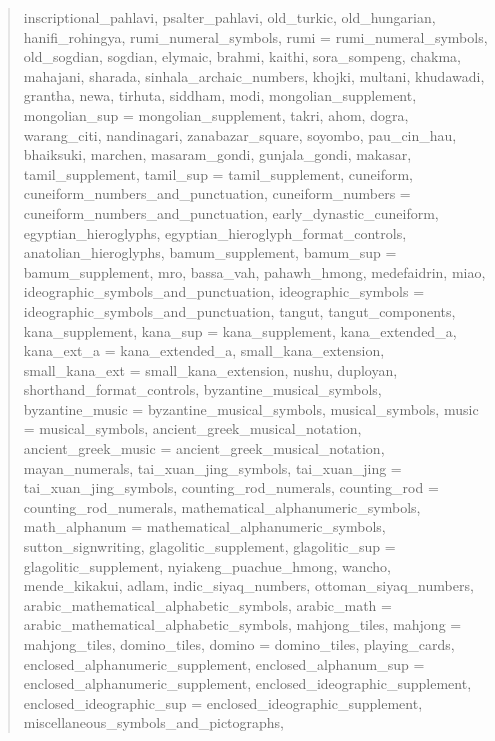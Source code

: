 \documentclass{wg21}
\begin{document}
\begin{quote}
\begin{itemdecl}
{    inscriptional_pahlavi,
    psalter_pahlavi,
    old_turkic,
    old_hungarian,
    hanifi_rohingya,
    rumi_numeral_symbols,
    rumi = rumi_numeral_symbols,
    old_sogdian,
    sogdian,
    elymaic,
    brahmi,
    kaithi,
    sora_sompeng,
    chakma,
    mahajani,
    sharada,
    sinhala_archaic_numbers,
    khojki,
    multani,
    khudawadi,
    grantha,
    newa,
    tirhuta,
    siddham,
    modi,
    mongolian_supplement,
    mongolian_sup = mongolian_supplement,
    takri,
    ahom,
    dogra,
    warang_citi,
    nandinagari,
    zanabazar_square,
    soyombo,
    pau_cin_hau,
    bhaiksuki,
    marchen,
    masaram_gondi,
    gunjala_gondi,
    makasar,
    tamil_supplement,
    tamil_sup = tamil_supplement,
    cuneiform,
    cuneiform_numbers_and_punctuation,
    cuneiform_numbers = cuneiform_numbers_and_punctuation,
    early_dynastic_cuneiform,
    egyptian_hieroglyphs,
    egyptian_hieroglyph_format_controls,
    anatolian_hieroglyphs,
    bamum_supplement,
    bamum_sup = bamum_supplement,
    mro,
    bassa_vah,
    pahawh_hmong,
    medefaidrin,
    miao,
    ideographic_symbols_and_punctuation,
    ideographic_symbols = ideographic_symbols_and_punctuation,
    tangut,
    tangut_components,
    kana_supplement,
    kana_sup = kana_supplement,
    kana_extended_a,
    kana_ext_a = kana_extended_a,
    small_kana_extension,
    small_kana_ext = small_kana_extension,
    nushu,
    duployan,
    shorthand_format_controls,
    byzantine_musical_symbols,
    byzantine_music = byzantine_musical_symbols,
    musical_symbols,
    music = musical_symbols,
    ancient_greek_musical_notation,
    ancient_greek_music = ancient_greek_musical_notation,
    mayan_numerals,
    tai_xuan_jing_symbols,
    tai_xuan_jing = tai_xuan_jing_symbols,
    counting_rod_numerals,
    counting_rod = counting_rod_numerals,
    mathematical_alphanumeric_symbols,
    math_alphanum = mathematical_alphanumeric_symbols,
    sutton_signwriting,
    glagolitic_supplement,
    glagolitic_sup = glagolitic_supplement,
    nyiakeng_puachue_hmong,
    wancho,
    mende_kikakui,
    adlam,
    indic_siyaq_numbers,
    ottoman_siyaq_numbers,
    arabic_mathematical_alphabetic_symbols,
    arabic_math = arabic_mathematical_alphabetic_symbols,
    mahjong_tiles,
    mahjong = mahjong_tiles,
    domino_tiles,
    domino = domino_tiles,
    playing_cards,
    enclosed_alphanumeric_supplement,
    enclosed_alphanum_sup = enclosed_alphanumeric_supplement,
    enclosed_ideographic_supplement,
    enclosed_ideographic_sup = enclosed_ideographic_supplement,
    miscellaneous_symbols_and_pictographs,
}
\end{itemdecl}
\end{quote}
\end{document}
